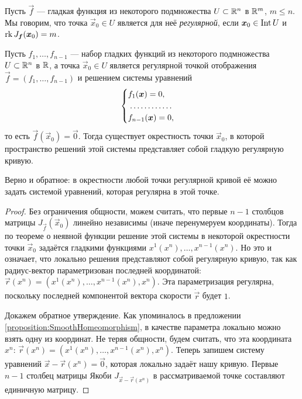 \begin{definition}
	Пусть $\vec{f}$ --- гладкая функция из некоторого подмножества $U \subset \mathbb{R}^n$ в $\mathbb{R}^m$, $m \leqslant n$. Мы говорим, что точка $\vec{x}_0 \in U$ является для неё \textit{регулярной}, если $\boldsymbol{x}_0 \in \operatorname{Int} U$ и $\operatorname{rk} J_{\boldsymbol{f}}(\boldsymbol{x}_0) = m$.
\end{definition}

\begin{theorem} \label{theorem:SurfacesToCurve}
	Пусть $f_1, \ldots, f_{n - 1}$ --- набор гладких функций из некоторого подмножества $U \subset \mathbb{R}^n$ в $\mathbb{R}$, а точка $\vec{x}_0 \in U$ является регулярной точкой отображения $\vec{f} = (f_1, \ldots, f_{n - 1})$ и решением системы уравнений
	\[
		\begin{cases}
			f_1(\vec{x}) = 0,\\
			\dotfill\\
			f_{n - 1}(\vec{x}) = 0,
		\end{cases}
	\]
	то есть $\vec{f}(\vec{x}_0) = \vec{0}$. Тогда существует окрестность точки $\vec{x}_0$, в которой пространство решений этой системы представляет собой гладкую регулярную кривую.
	
	Верно и обратное: в окрестности любой точки регулярной кривой её можно задать системой уравнений, которая регулярна в этой точке.
\end{theorem}

\begin{proof}
	Без ограничения общности, можем считать, что первые $n - 1$ столбцов матрицы $J_{\vec{f}}(\vec{x}_0)$ линейно независимы (иначе перенумеруем координаты). Тогда по теореме о неявной функции решение этой системы в некоторой окрестности точки $\vec{x}_0$ задаётся гладкими функциями $x^1(x^n), \ldots, x^{n - 1}(x^n)$. Но это и означает, что локально решения представляют собой регулярную кривую, так как радиус-вектор параметризован последней координатой: $\vec{r}(x^n) = (x^1(x^n), \ldots, x^{n - 1}(x^n), x^n)$. Эта параметризация регулярна, поскольку последней компонентой вектора скорости $\dot{\vec{r}}$ будет $1$.

	Докажем обратное утверждение. Как упоминалось в предложении \ref{proposition:SmoothHomeomorphism}, в качестве параметра локально можно взять одну из координат. Не теряя общности, будем считать, что эта координата $x^n$: $\vec{r}(x^n) = (x^1(x^n), \ldots, x^{n - 1}(x^n), x^n)$. Теперь запишем систему уравнений $\vec{x} - \vec{r}(x^n) = \vec{0}$, которая локально задаёт нашу кривую. Первые $n - 1$ столбец матрицы Якоби $J_{\vec{x} - \vec{r}(x^n)}$ в рассматриваемой точке составляют единичную матрицу.
\end{proof}

